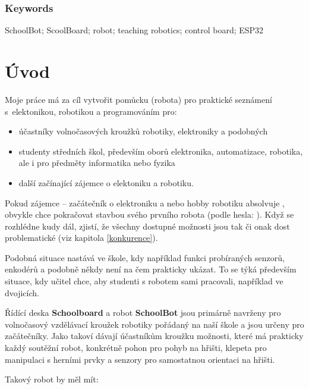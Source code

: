 \documentclass{template/socthesis}
\begin{document}
\subsection*{Keywords}
SchoolBot; ScoolBoard; robot; teaching robotics; control board; ESP32

\newpage
\pagestyle{plain}

\tableofcontents %

\setcounter{figure}{0}
\setcounter{table}{0}
\newpage

\chapter*{Úvod}
Moje práce má za cíl vytvořit pomůcku (robota) pro praktické seznámení s~elektonikou, robotikou a programováním pro:  

\begin{itemize}
	\item účastníky volnočasových kroužků robotiky, elektroniky a podobných
	\item studenty středních škol, především oborů elektronika, automatizace, robotika, ale i pro předměty informatika nebo fyzika
	\item další začínající zájemce o elektoniku a robotiku. 
\end{itemize}


 Pokud zájemce -- začátečník  o elektroniku a nebo hobby robotiku absolvuje , obvykle chce pokračovat stavbou svého prvního robota (podle hesla: ). Když se 
 rozhlédne kudy dál, zjistí, že všechny dostupné možnosti jsou tak či onak dost problematické (viz kapitola \ref{konkurence}). 
 
 Podobná situace nastává ve škole, kdy například funkci probíraných senzorů, enkodérů a podobně někdy není na čem prakticky ukázat. To se týká především situace, kdy učitel chce, aby studenti s robotem sami pracovali, například ve dvojicích.   

Řídící deska \textbf{Schoolboard} a robot \textbf{SchoolBot} jsou primárně navrženy pro volnočasový vzdělávací kroužek robotiky pořádaný na naší škole a jsou určeny pro začátečníky. Jako takoví dávají účastníkům kroužku možnosti, které má prakticky každý soutěžní robot, konkrétně pohon pro pohyb na hřišti, klepeta pro manipulaci s herními prvky a senzory pro samostatnou orientaci na hřišti. 
\newpage

 Takový robot by měl mít: 
\end{document}
